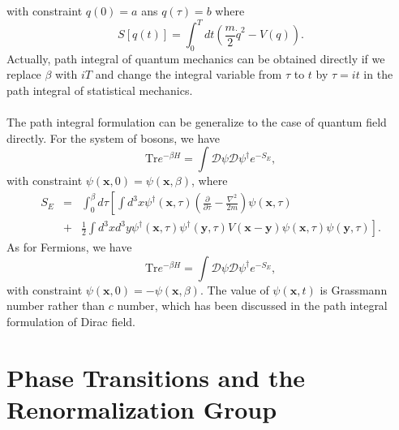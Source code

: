 with constraint $q(0) = a$ ans $q(\tau) = b$
where
\[S[q(t)] = \int_0^{T} dt \left(\frac{m}{2}\dot{q}^2 - V(q) \right).\]
Actually, path integral of quantum mechanics can be obtained directly if we replace $\beta$ with $iT$ and change the integral variable from $\tau$ to $t$ by $\tau = it$ in the path integral  of statistical mechanics.
\\ \\
The path integral formulation can be generalize to the case of quantum field directly. For the system of bosons, we have
\[\mathrm{Tr}e^{-\beta H} = \int \mathcal{D}\psi \mathcal{D}\psi^{\dagger} e^{-S_E},\]
with constraint $\psi(\bm{x},0) = \psi(\bm{x},\beta)$,
where
\begin{eqnarray}
S_E &=& \int_0^{\beta}d\tau \left[ \int d^3x \psi^{\dagger}(\bm{x},\tau) \left( \frac{\partial}{\partial \tau} - \frac{\nabla^2}{2m} \right) \psi(\bm{x},\tau) \right. \nonumber \\
&+& \left. \frac{1}{2}\int d^3x d^3y\psi^{\dagger}(\bm{x},\tau)\psi^{\dagger}(\bm{y},\tau)V(\bm{x}-\bm{y})\psi(\bm{x},\tau)\psi(\bm{y},\tau) \right] .\nonumber
\end{eqnarray}
As for Fermions, we have
\[\mathrm{Tr}e^{-\beta H} = \int \mathcal{D}\psi \mathcal{D}\psi^{\dagger} e^{-S_E},\]
with constraint $\psi(\bm{x},0) = -\psi(\bm{x},\beta)$. 
The value of $\psi(\bm{x},t)$ is Grassmann number rather than $c$ number, which has been discussed in the path integral formulation of Dirac field.

\chapter{Phase Transitions and the Renormalization Group}
